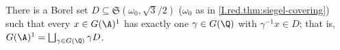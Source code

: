 There is a Borel set $D\subseteq\mathfrak S(\omega_0,\sqrt3/2)$ ($\omega_0$ as in \cref{I.red.thm:siegel-covering}) such
that every $x\in G(\A)^1$ has exactly one $\gamma\in G(\Q)$ with $\gamma^{-1}x\in D$; that is,
$G(\A)^1=\bigsqcup_{\gamma\in G(\Q)}\gamma D$.
